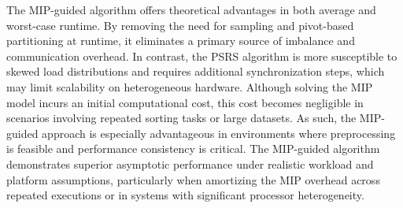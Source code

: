 \documentclass[]{interact}
\theoremstyle{plain}
\theoremstyle{definition}
\theoremstyle{remark}
\begin{document}
The MIP-guided algorithm offers theoretical advantages in both average and worst-case runtime. By removing the need for sampling and pivot-based partitioning at runtime, it eliminates a primary source of imbalance and communication overhead. In contrast, the PSRS algorithm is more susceptible to skewed load distributions and requires additional synchronization steps, which may limit scalability on heterogeneous hardware. Although solving the MIP model incurs an initial computational cost, this cost becomes negligible in scenarios involving repeated sorting tasks or large datasets. As such, the MIP-guided approach is especially advantageous in environments where preprocessing is feasible and performance consistency is critical. The MIP-guided algorithm demonstrates superior asymptotic performance under realistic workload and platform assumptions, particularly when amortizing the MIP overhead across repeated executions or in systems with significant processor heterogeneity.








\end{document}

